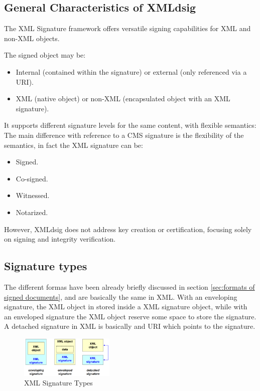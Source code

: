 \subsection{General Characteristics of XMLdsig}

The XML Signature framework offers versatile signing capabilities for
XML and non-XML objects.

The signed object may be:
\begin{itemize}
  \item Internal (contained within the signature) or external
    (only referenced via a URI).
  \item XML (native object) or non-XML (encapsulated object with an
    XML signature).
\end{itemize}

It supports different signature levels for the same content, with
flexible semantics:
The main difference with reference to a CMS signature is the
flexibility of the semantics, in fact the XML signature can be:
\begin{itemize}
  \item Signed.
  \item Co-signed.
  \item Witnessed.
  \item Notarized.
\end{itemize}

However, XMLdsig does not address key creation or certification,
focusing solely on signing and integrity verification.

\subsection{Signature types}
The different formas have been already briefly discussed in section 
\ref{sec:formats of signed documents}, and are basically the same in
XML. With an enveloping signature, the XML object in stored inside a
XML signature object, while with an enveloped signature the XML object 
reserve some space to store the signature. A detached signature in XML
is basically and URI which points to the signature.
\begin{figure}[H]
  \centering
  \includegraphics[width=0.4\textwidth]{img/xml signature types.png}
  \caption{XML Signature Types}
\end{figure}

